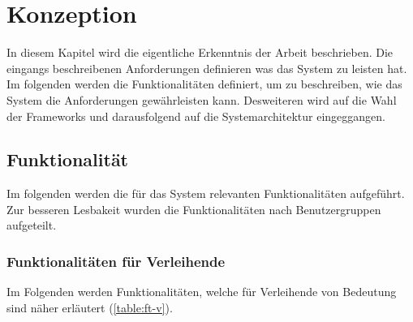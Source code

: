 \chapter{Konzeption}
\label{chapter-konzept}

In diesem Kapitel wird die eigentliche Erkenntnis der Arbeit beschrieben. Die
eingangs beschreibenen Anforderungen definieren was das System zu leisten hat.
Im folgenden werden die Funktionalitäten definiert, um zu beschreiben, wie das
System die Anforderungen gewährleisten kann. Desweiteren wird auf die Wahl der
Frameworks und darausfolgend auf die Systemarchitektur eingeggangen.

\section{Funktionalität}
\label{section:funktionalitaeten}
Im folgenden werden die für das System relevanten Funktionalitäten aufgeführt.
Zur besseren Lesbakeit wurden die Funktionalitäten nach Benutzergruppen
aufgeteilt.

\subsection{Funktionalitäten für Verleihende}
Im Folgenden werden Funktionalitäten, welche für Verleihende von Bedeutung sind
näher erläutert (\ref{table:ft-v}).

